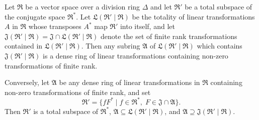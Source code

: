 Let $\mathfrak{R}$ be a vector space over a division ring $\Delta$ and let $\mathfrak{R}'$ be a total subspace of the conjugate space $\mathfrak{R}^*$. Let $\mathfrak{L}(\mathfrak{R}' \mid \mathfrak{R})$ be the totality of linear transformations $A$ in $\mathfrak{R}$ whose transposes $A^*$ map $\mathfrak{R}'$ into itself, and let $\mathfrak{J}(\mathfrak{R}' \mid \mathfrak{R}) = \mathfrak{J} \cap \mathfrak{L}(\mathfrak{R}' \mid \mathfrak{R})$ denote the set of finite rank transformations contained in $\mathfrak{L}(\mathfrak{R}' \mid \mathfrak{R})$. Then any subring $\mathfrak{A}$ of $\mathfrak{L}(\mathfrak{R}' \mid \mathfrak{R})$ which contains $\mathfrak{J}(\mathfrak{R}' \mid \mathfrak{R})$ is a dense ring of linear transformations containing non-zero transformations of finite rank.

Conversely, let $\mathfrak{A}$ be any dense ring of linear transformations in $\mathfrak{R}$ containing non-zero transformations of finite rank, and set
$$\mathfrak{R}' = \{ f F^* \mid f \in \mathfrak{R}^*, \; F \in \mathfrak{J} \cap \mathfrak{A} \}.$$
Then $\mathfrak{R}'$ is a total subspace of $\mathfrak{R}^*$, $\mathfrak{A} \subseteq \mathfrak{L}(\mathfrak{R}' \mid \mathfrak{R})$, and $\mathfrak{A} \supseteq \mathfrak{J}(\mathfrak{R}' \mid \mathfrak{R})$.
